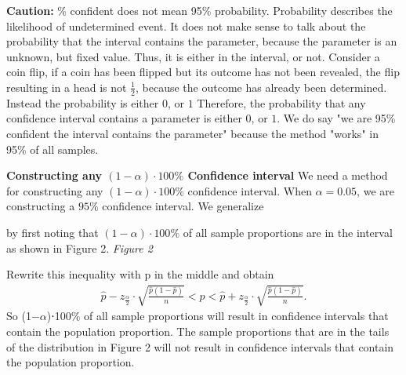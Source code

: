 \documentclass{report}
\begin{document}
    \bigbreak \noindent \bigbreak \noindent 
    \bigbreak \noindent 
    \textbf{Caution:}
    \bigbreak {}\% confident does not mean 95\% probability. Probability describes the likelihood of undetermined event.
    \bigbreak \noindent 
    It does not make sense to talk about the probability that the interval contains the parameter, because the parameter is an unknown, but fixed value. Thus, it is either in the interval, or not. 
    \bigbreak \noindent 
    Consider a coin flip, if a coin has been flipped but its outcome has not been revealed, the flip resulting in a head is not $\frac{1}{2} $, because the outcome has already been determined. Instead the probability is either $0$, or $1$
    \bigbreak \noindent 
    Therefore, the probability that any confidence interval contains a parameter is either $0$, or $1$.
    \bigbreak \noindent 
    We do say "we are 95\% confident the interval contains the parameter" because the method "works" in 95\% of all samples.

    \pagebreak \bigbreak \noindent 
    \textbf{Constructing any $(1-\alpha)\cdot 100\% $ Confidence interval}
    \bigbreak \noindent 
    We need a method for constructing any $(1-\alpha) \cdot 100\%$ confidence interval. When $\alpha=0.05$, we are constructing a $95\%$ confidence interval.
    \bigbreak \noindent 
    We generalize
    \begin{figure}[ht]
        \centering
        \label{fig:construct}
    \end{figure}
    \bigbreak \noindent 
    by first noting that $(1-\alpha)\cdot 100\%$  of all sample proportions are in the interval as shown in Figure 2.
    \bigbreak \noindent 
    \textit{Figure 2}
    \bigbreak \noindent 
    \begin{figure}[ht]
        \centering
        \label{fig:const}
    \end{figure}
    \bigbreak \noindent 
    Rewrite this inequality with p in the middle and obtain
    \begin{align*}
        \hat{p} - z_{\frac{\alpha}{2}} \cdot \sqrt{\frac{\hat{p}(1 - \hat{p})}{n}} < p < \hat{p} + z_{\frac{\alpha}{2}} \cdot \sqrt{\frac{\hat{p}(1 - \hat{p})}{{n}}}
    .\end{align*}
    \bigbreak \noindent 
    So (1−$\alpha $)⋅100\% of all sample proportions will result in confidence intervals that contain the population proportion. The sample proportions that are in the tails of the distribution in Figure 2 will not result in confidence intervals that contain the population proportion.
\end{document}
